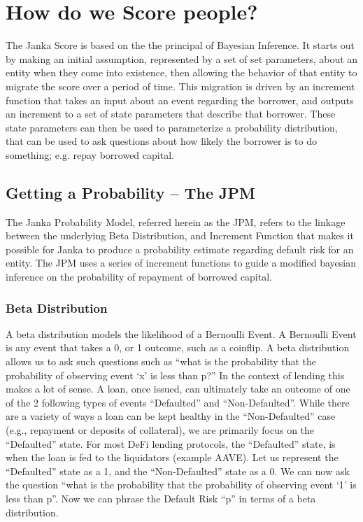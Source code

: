 \documentclass{article}
\begin{document}
\section{How do we Score people?}

    The Janka Score is based on the the principal of Bayesian Inference. It starts out by making an initial assumption, represented by a set of set parameters, about an entity when they come into existence, then allowing the behavior of that entity to migrate the score over a period of time. This migration is driven by an increment function that takes an input about an event regarding the borrower, and outputs an increment to a set of state parameters that describe that borrower. These state parameters can then be used to parameterize a probability distribution, that can be used to ask questions about how likely the borrower is to do something; e.g. repay borrowed capital. 

    \subsection{Getting a Probability -- The JPM}

    The Janka Probability Model, referred herein as the JPM, refers to the linkage between the underlying Beta Distribution, and Increment Function that makes it possible for Janka to produce a probability estimate regarding default risk for an entity. The JPM uses a series of increment functions to guide a modified bayesian inference on the probability of repayment of borrowed capital.

    \subsubsection{Beta Distribution}

    A beta distribution models the likelihood of a Bernoulli Event. A Bernoulli Event is any event that takes a 0, or 1 outcome, such as a coinflip. A beta distribution allows us to ask such questions such as “what is the probability that the probability of observing event ‘x’ is less than p?” In the context of lending this makes a lot of sense. A loan, once issued, can ultimately take an outcome of one of the 2 following types of events “Defaulted” and “Non-Defaulted”. While there are a variety of ways a loan can be kept healthy in the “Non-Defaulted” case (e.g., repayment or deposits of collateral), we are primarily focus on the “Defaulted” state. For most DeFi lending protocols, the “Defaulted” state, is when the loan is fed to the liquidators (example AAVE). Let us represent the “Defaulted” state as a 1, and the “Non-Defaulted” state as a 0. We can now ask the question “what is the probability that the probability of observing event ‘1’ is less than p”. Now we can phrase the Default Risk “p” in terms of a beta distribution.
\end{document}
